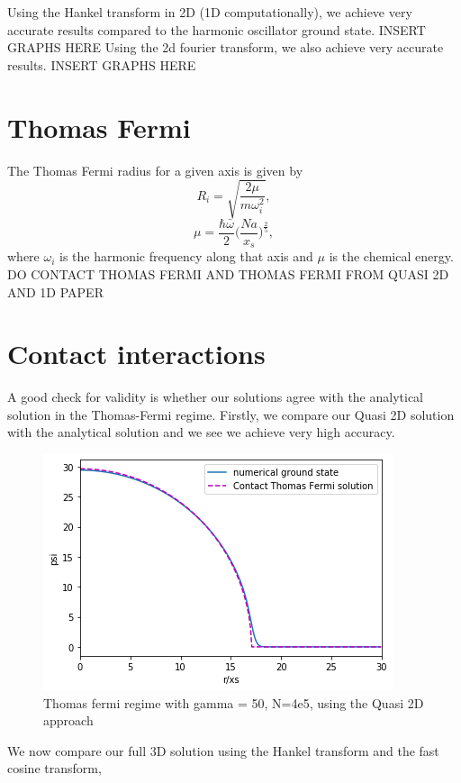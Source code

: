 \documentclass[10pt]{article}
\begin{document}
\begin{multicols}{2}
	
Using the Hankel transform in 2D (1D computationally), we achieve very accurate results compared to the harmonic oscillator ground state.
INSERT GRAPHS HERE
Using the 2d fourier transform, we also achieve very accurate results.
INSERT GRAPHS HERE


\section{Thomas Fermi}
The Thomas Fermi radius for a given axis is given by 
\begin{equation}
R_{i} = \sqrt{\frac{2\mu}{m\omega_{i}^2}},
\end{equation}
\begin{equation}
\mu = \frac{\hbar\bar{\omega}}{2}\bigg(\frac{Na}{x_{s}}\bigg)^{\frac{2}{5}},
\end{equation}
where $\omega_{i}$ is the harmonic frequency along that axis and $\mu$ is the chemical energy. 
DO CONTACT THOMAS FERMI AND THOMAS FERMI FROM QUASI 2D AND 1D PAPER

\section{Contact interactions}
A good check for validity is whether our solutions agree with the analytical solution in the Thomas-Fermi regime. Firstly, we compare our Quasi 2D solution with the analytical solution and we see we achieve very high accuracy.

 
\begin{figure}[H]
\centering
\includegraphics[width=0.6\linewidth]{ContactThomasFermiQuasi 2DHankelgamma=50No=4e5}
\caption{Thomas fermi regime with gamma = 50, N=4e5, using the Quasi 2D approach}
\end{figure}

We now compare our full 3D solution using the Hankel transform and the fast cosine transform, 


\end{multicols}
\end{document}
